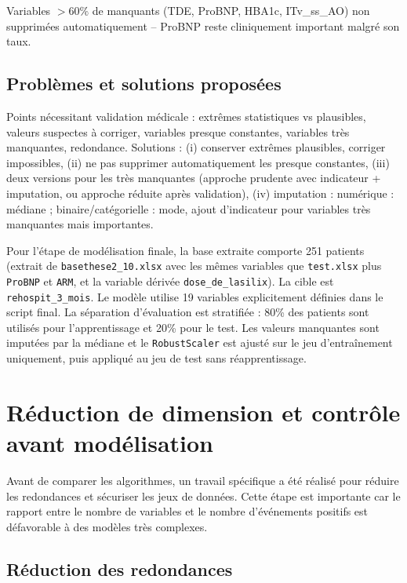 \documentclass[12pt,a4paper]{report}
\begin{document}
Variables $>60\%$ de manquants (TDE, ProBNP, HBA1c, ITv\_ss\_AO) non supprimées
automatiquement -- ProBNP reste cliniquement important malgré son taux.

\subsection{Problèmes et solutions proposées}

Points nécessitant validation médicale : extrêmes statistiques vs plausibles, valeurs
suspectes à corriger, variables presque constantes, variables très manquantes,
redondance. Solutions : (i) conserver extrêmes plausibles, corriger impossibles,
(ii) ne pas supprimer automatiquement les presque constantes, (iii) deux versions pour
les très manquantes (approche prudente avec indicateur + imputation, ou approche réduite après validation),
(iv) imputation : numérique : médiane ; binaire/catégorielle : mode,
ajout d'indicateur pour variables très manquantes mais importantes.

Pour l'étape de modélisation finale, la base extraite comporte 251 patients (extrait de \texttt{basethese2\_10.xlsx} avec les mêmes variables que \texttt{test.xlsx} plus \texttt{ProBNP} et \texttt{ARM}, et la variable dérivée \texttt{dose\_de\_lasilix}). La cible est
\texttt{rehospit\_3\_mois}. Le modèle utilise 19 variables explicitement
définies dans le script final. La séparation d'évaluation est stratifiée : 80\% des patients
sont utilisés pour l'apprentissage et 20\% pour le test. Les
valeurs manquantes sont imputées par la médiane et le \texttt{RobustScaler} est ajusté sur
le jeu d'entraînement uniquement, puis appliqué au jeu de test sans réapprentissage.

\section{Réduction de dimension et contrôle avant modélisation}

Avant de comparer les algorithmes, un travail spécifique a été réalisé pour réduire les
redondances et sécuriser les jeux de données. Cette étape est importante car le rapport
entre le nombre de variables et le nombre d'événements positifs est défavorable à des
modèles très complexes.

\subsection{Réduction des redondances}
\end{document}
